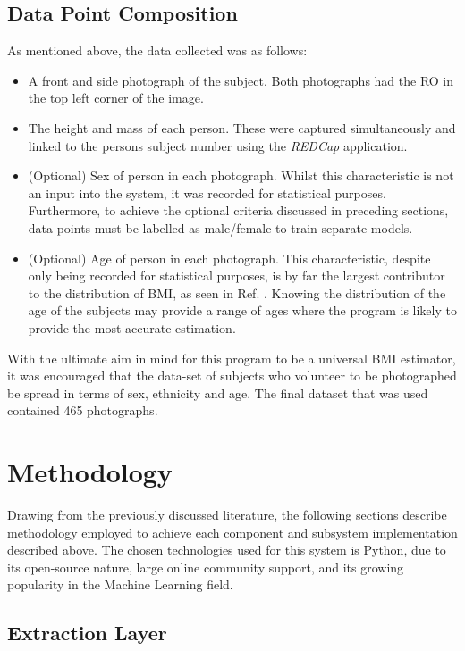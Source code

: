 \documentclass[conference]{IEEEtran}
\begin{document}
\subsection{Data Point Composition}
As mentioned above, the data collected was as follows:
\begin{itemize}
\item A front and side photograph of the subject.
Both photographs had the RO in the top left corner of the image.
\item The height and mass of each person.
These were captured simultaneously and linked to the persons subject number using the \textit{REDCap} application.
\item (Optional) Sex of person in each photograph.
Whilst this characteristic is not an input into the system, it was recorded for statistical purposes.
Furthermore, to achieve the optional criteria discussed in preceding sections, data points must be labelled as male/female to train separate models.
\item (Optional) Age of person in each photograph.
This characteristic, despite only being recorded for statistical purposes, is by far the largest contributor to the distribution of BMI, as seen in Ref. \cite{bmiage}.
Knowing the distribution of the age of the subjects may provide a range of ages where the program is likely to provide the most accurate estimation.
\end{itemize}
With the ultimate aim in mind for this program to be a universal BMI estimator, it was encouraged that the data-set of subjects who volunteer to be photographed be spread in terms of sex, ethnicity and age.
The final dataset that was used contained 465 photographs.

\section{Methodology}
Drawing from the previously discussed literature, the following sections describe methodology employed to achieve each component and subsystem implementation described above.
The chosen technologies used for this system is Python, due to its open-source nature, large online community support, and its growing popularity in the Machine Learning field.
\subsection{Extraction Layer}
\end{document}
